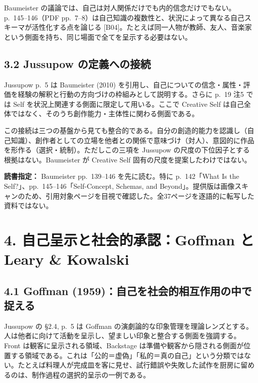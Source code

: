 \documentclass[
  11pt,
  a4paper,
]{article}
\begin{document}
Baumeister
の議論では、自己は対人関係だけでも内的信念だけでもない。p.~145--146（PDF
pp.~7--8）は自己知識の複数性と、状況によって異なる自己スキーマが活性化する点を論じる
{[}B04{]}。たとえば同一人物が教師、友人、音楽家という側面を持ち、同じ場面で全てを呈示する必要はない。

\subsection{3.2 Jussupow
の定義への接続}\label{jussupow-ux306eux5b9aux7fa9ux3078ux306eux63a5ux7d9a}

Jussupow p.~5 は Baumeister (2010)
を引用し、自己についての信念・属性・評価を経験の解釈と行動の方向づけの枠組みとして説明する。さらに
p.~19 注5 では Self を状況上関連する側面に限定して用いる。ここで
Creative Self
は自己全体ではなく、そのうち創作能力・主体性に関わる側面である。

この接続は三つの基盤から見ても整合的である。自分の創造的能力を認識し（自己知識）、創作者としての立場を他者との関係で意味づけ（対人）、意図的に作品を形作る（選択・統制）。ただしこの三項を
Jussupow の尺度の下位因子とする根拠はない。Baumeister が Creative Self
固有の尺度を提案したわけではない。

\textbf{読書指定：} Baumeister pp.~139--146 を先に読む。特に
p.~142「What Is the Self?」、pp.~145--146「Self-Concept, Schemas, and
Beyond」。提供版は画像スキャンのため、引用対象ページを目視で確認した。全37ページを逐語的に転写した資料ではない。

\section{4. 自己呈示と社会的承認：Goffman と Leary \&
Kowalski}\label{ux81eaux5df1ux5448ux793aux3068ux793eux4f1aux7684ux627fux8a8dgoffman-ux3068-leary-kowalski}

\subsection{4.1 Goffman
(1959)：自己を社会的相互作用の中で捉える}\label{goffman-1959ux81eaux5df1ux3092ux793eux4f1aux7684ux76f8ux4e92ux4f5cux7528ux306eux4e2dux3067ux6349ux3048ux308b}

Jussupow の §2.4, p.~5 は Goffman
の演劇論的な印象管理を理論レンズとする。人は他者に向けて活動を呈示し、望ましい印象と整合する側面を強調する。Front
は観客に呈示される領域、Backstage
は準備や観客から隠される側面が位置する領域である。これは「公的＝虚偽」「私的＝真の自己」という分類ではない。たとえば料理人が完成皿を客に見せ、試行錯誤や失敗した試作を厨房に留めるのは、制作過程の選択的呈示の一例である。
\end{document}
